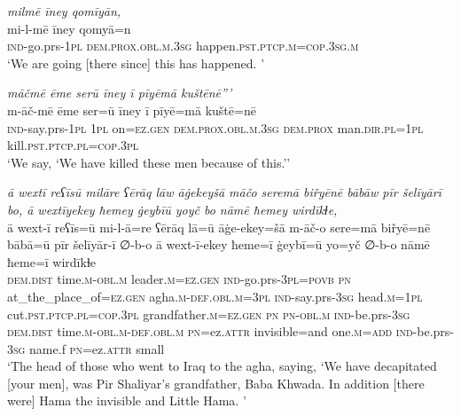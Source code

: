 \ea \label{BP.119}
\textit{milmē īney qomīyān,} \\ 
\gll mi-l-mē īney qomyā=n \\ 
 \textsc{ind-}go.prs\textsc{-\textsc{1pl}} \textsc{dem.prox}\textsc{.obl}\textsc{.m}\textsc{.3sg} happen\textsc{.pst}\textsc{.ptcp}\textsc{.m}\textsc{=cop}\textsc{.3sg}\textsc{.m} \\ 
\glt `We are going [there since] this has happened. '
\z 
 
\ea \label{BP.121}
\textit{māčmē ēme serū īney ī pīyēmā kuštēnē”’} \\ 
\gll m-āč-mē ēme ser=ū īney ī pīyē=mā kuštē=nē \\ 
 \textsc{ind-}say.prs\textsc{-\textsc{1pl}} \textsc{1pl} on\textsc{=ez.gen} \textsc{dem.prox}\textsc{.obl}\textsc{.m}\textsc{.3sg} \textsc{dem.prox} man\textsc{.dir}\textsc{.pl}\textsc{=\textsc{1pl}} kill\textsc{.pst}\textsc{.ptcp}\textsc{.pl}\textsc{=cop}\textsc{.3pl} \\ 
\glt `We say, ‘We have killed these men because of this.’'
\z 
 
\ea \label{BP.122}
\textit{ā wextī reʕīsū milāre ʕērāq lāw āġekeyšā māčo seremā biřyēnē bābāw pīr šelīyārī bo, ā wextīyekey ħemey ġeybīū yoyč bo nāmē ħemey wirdīkɫe,} \\ 
\gll ā wext-ī reʕīs=ū mi-l-ā=re ʕērāq lā=ū āġe-ekey=šā m-āč-o sere=mā biřyē=nē bābā=ū pīr šelīyār-ī ∅-b-o ā wext-ī-ekey ħeme=ī ġeybī=ū yo=yč ∅-b-o nāmē ħeme=ī wirdīkɫe \\ 
 \textsc{dem.dist} time\textsc{.m}\textsc{-obl}\textsc{.m} leader\textsc{.m}\textsc{=ez.gen} \textsc{ind-}go.prs\textsc{-3pl}\textsc{=\textsc{povb}} \textsc{pn} at\_the\_place\_of\textsc{=ez.gen} agha\textsc{.m}\textsc{-def}\textsc{.obl}\textsc{.m}\textsc{=3pl} \textsc{ind-}say.prs\textsc{-3sg} head\textsc{.m}\textsc{=\textsc{1pl}} cut\textsc{.pst}\textsc{.ptcp}\textsc{.pl}\textsc{=cop}\textsc{.3pl} grandfather\textsc{.m}\textsc{=ez.gen} \textsc{pn} \textsc{pn}\textsc{-obl}\textsc{.m} \textsc{ind-}be.prs\textsc{-3sg} \textsc{dem.dist} time\textsc{.m}\textsc{-obl}\textsc{.m}\textsc{-def}\textsc{.obl}\textsc{.m} \textsc{pn}=ez.\textsc{attr} invisible=and one\textsc{.m}\textsc{=add} \textsc{ind-}be.prs\textsc{-3sg} name.f \textsc{pn}=ez.\textsc{attr} small \\ 
\glt `The head of those who went to Iraq to the agha, saying, ‘We have decapitated [your men], was Pir Shaliyar’s grandfather, Baba Khwada. In addition [there were] Hama the invisible and Little Hama. '
\z 
 

